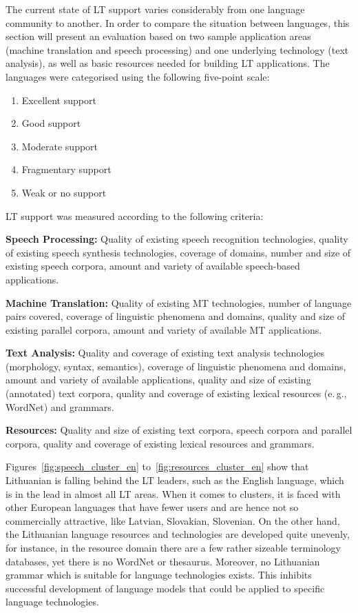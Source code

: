 \begin{multicols}{2}
The current state of LT support varies considerably from one language community to another. In order to compare the situation between languages, this section will present an evaluation based on two sample application areas (machine translation and speech processing) and one underlying technology (text analysis), as well as basic resources needed for building LT applications. The languages were categorised using the following five-point scale: 

\begin{enumerate}
\item Excellent support
\item Good support
\item Moderate support
\item Fragmentary support
\item Weak or no support
\end{enumerate}

LT support was measured according to the following criteria:

\textbf{Speech Processing:} Quality of existing speech recognition technologies, quality of existing speech synthesis technologies, coverage of domains, number and size of existing speech corpora, amount and variety of available speech-based applications.

\textbf{Machine Translation:} Quality of existing MT technologies, number of language pairs covered, coverage of linguistic phenomena and domains, quality and size of existing parallel corpora, amount and variety of available MT applications.

\textbf{Text Analysis:} Quality and coverage of existing text analysis technologies (morphology, syntax, semantics), coverage of linguistic phenomena and domains, amount and variety of available applications, quality and size of existing (annotated) text corpora, quality and coverage of existing lexical resources (e.\,g., WordNet) and grammars.

\textbf{Resources:} Quality and size of existing text corpora, speech corpora and parallel corpora, quality and coverage of existing lexical resources and grammars.

Figures~\ref{fig:speech_cluster_en} to~\ref{fig:resources_cluster_en} show that Lithuanian is falling behind the LT leaders, such as the English language, which is in the lead in almost all LT areas. When it comes to clusters, it is faced with other European languages that have fewer users and are hence not so commercially attractive, like Latvian, Slovakian, Slovenian. On the other hand, the Lithuanian language resources and technologies are developed quite unevenly, for instance, in the resource domain there are a few rather sizeable terminology databases, yet there is no WordNet or thesaurus. Moreover, no Lithuanian grammar which is suitable for language technologies exists. This inhibits successful development of language models that could be applied to specific language technologies.


\end{multicols}
